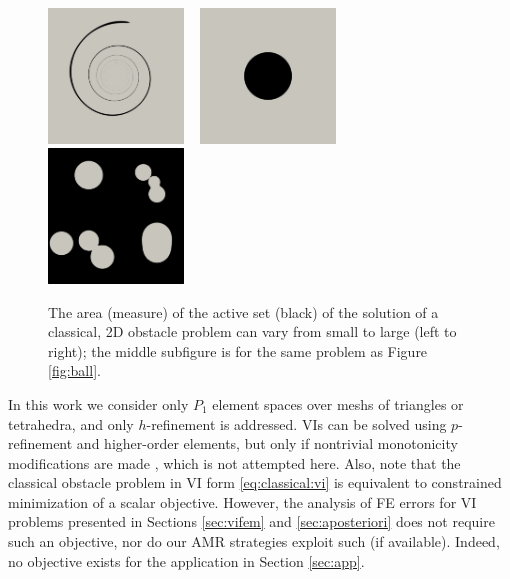 \documentclass[]{interact}
\theoremstyle{plain}%
\theoremstyle{definition}
\theoremstyle{remark}
\begin{document}
\begin{figure}[ht]
\noindent \hspace{-1mm} \mbox{\includegraphics[width=0.32\textwidth]{static/spiral.png} \, \includegraphics[width=0.32\textwidth]{static/sphere.png} \, \includegraphics[width=0.32\textwidth]{static/blisters.png}}
\caption{The area (measure) of the active set (black) of the solution of a classical, 2D obstacle problem can vary from small to large (left to right); the middle subfigure is for the same problem as Figure \ref{fig:ball}.}
\label{fig:activesizes}
\end{figure}

In this work we consider only $P_1$ element spaces over meshs of triangles or tetrahedra, and only $h$-refinement is addressed.  VIs can be solved using $p$-refinement and higher-order elements, but only if nontrivial monotonicity modifications are made \cite{KeithSurowiec2024}, which is not attempted here.  Also, note that the classical obstacle problem in VI form \eqref{eq:classical:vi} is equivalent to constrained minimization of a scalar objective.  However, the analysis of FE errors for VI problems presented in Sections \ref{sec:vifem} and \ref{sec:aposteriori} does not require such an objective, nor do our AMR strategies exploit such (if available).  Indeed, no objective exists for the application in Section \ref{sec:app}.
\end{document}
